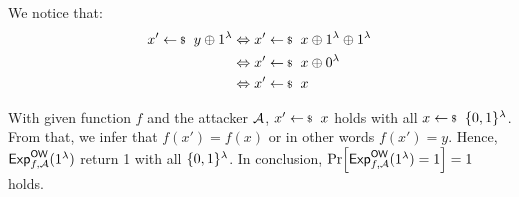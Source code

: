 We notice that:
\begin{align*}
    x'\sample y \oplus 1^\lambda &\Leftrightarrow x'\sample x \oplus 1^\lambda \oplus 1^\lambda\\
    &\Leftrightarrow x'\sample x \oplus 0^\lambda\\
    &\Leftrightarrow x'\sample x
\end{align*}

With given function \(f\) and the attacker \(\mathcal{A}\),
\(x'\sample x\) holds with all \(x\sample \bin^\lambda\). From that,
we infer that \(f(x') = f(x)\) or in other words \(f(x') = y\). Hence,
\(\mathsf{Exp}_{f, \mathcal{A}}^{\mathsf{OW}}(1^\lambda)\) return 1 with all
\(\{0,1\}^\lambda\). In conclusion,
\(\prob{\mathsf{Exp}_{f, \adv}^{\mathsf{OW}}(1^\lambda) = 1} = 1\) holds.